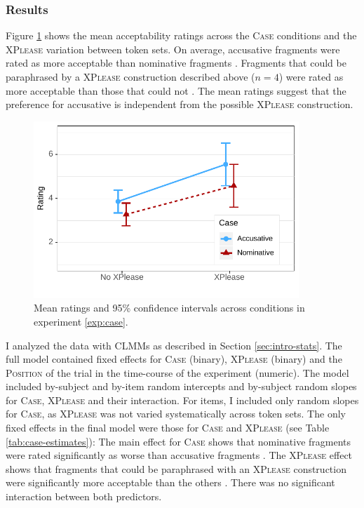 \subsubsection{Results}\label{sec:fragments-case-rating-results}

Figure \ref{fig:case-estimates} shows the mean acceptability ratings across the \textsc{Case} conditions and the \textsc{XPlease} variation between token sets. On average, accusative fragments  were rated as more acceptable than nominative fragments . Fragments that could be paraphrased by a \textsc{XPlease} construction described above ($n = 4$) were rated as more acceptable  than those that could not . The mean ratings suggest that the preference for accusative is independent from the possible \textsc{XPlease} construction.

\begin{figure}[t]
\includegraphics[width=10cm]{figures/ex1_case_estimates}
 \caption{Mean ratings and 95\% confidence intervals across conditions in experiment \ref{exp:case}. \label{fig:case-estimates}}
\end{figure}

I analyzed the data with CLMMs as described in Section \ref{sec:intro-stats}. The full model contained fixed effects for \textsc{Case} (binary), \textsc{XPlease} (binary) and the \textsc{Position} of the trial in the time-course of the experiment (numeric). The model included by-subject and by-item random intercepts and by-subject random slopes for \textsc{Case}, \textsc{XPlease} and their interaction. For items, I included only random slopes for \textsc{Case}, as \textsc{XPlease} was not varied systematically across token sets. The only fixed effects in the final model were those for \textsc{Case} and \textsc{XPlease} (see Table \ref{tab:case-estimates}): The main effect for \textsc{Case} shows that nominative fragments were rated significantly as worse than accusative fragments . The \textsc{XPlease} effect shows that fragments that could be paraphrased with an \textsc{XPlease} construction were significantly more acceptable than the others . There was no significant interaction between both predictors.

